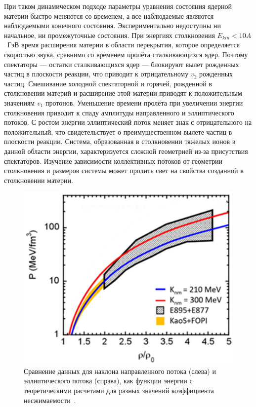 При таком динамическом подходе параметры уравнения состояния ядерной материи быстро меняются со временем, а все наблюдаемые являются наблюдаемыми конечного состояния. 
Экспериментально недоступны ни начальное, ни промежуточные состояния. 
При энергиях столкновения $E_{kin}<10A$~ГэВ время расширения материи в области перекрытия, которое определяется скоростью звука, сравнимо со временем пролёта сталкивающихся ядер.
Поэтому спектаторы --- остатки сталкивающихся ядер --- блокируют вылет рожденных частиц в плоскости реакции, что приводит к отрицательному $v_2$ рожденных частиц. 
Смешивание холодной спектаторной и горячей, рожденной в столкновении материй и расширение этой материи приводят к положительным значениям $v_1$ протонов.
Уменьшение времени пролёта при увеличении энергии столкновения приводит к спаду амплитуды направленного и эллиптического потоков. 
С ростом энергии эллиптический поток меняет знак с отрицательного на положительный, что свидетельствует о преимущественном вылете частиц в плоскости реакции.
Система, образованная в столкновении тяжелых ионов в данной области энергии, характеризуется сложной геометрией из-за присутствия спектаторов.
Изучение зависимости коллективных потоков от геометрии столкновения и размеров системы может пролить свет на свойства созданной в столкновении материи.

\begin{figure}[h]
    \centering
    \includegraphics[width=0.3\linewidth]{images/particles-06-00036-g001.png}
    \caption{Сравнение данных для наклона направленного потока (слева) и эллиптического потока (справа), как функции энергии с теоретическими расчетами для разных значений коэффициента несжимаемости~\cite{Danielewicz:2002pu}.}
    \label{fig:v2_jam}
\end{figure}


